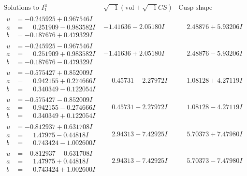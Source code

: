 \documentclass[1p]{elsarticle_modified}
\theoremstyle{definition}
\newcommand{\I}{\sqrt{-1}}
\begin{document}
$$\begin{array}{c|c|c}  
\text{Solutions to }I^u_{1}& \I (\text{vol} + \sqrt{-1}CS) & \text{Cusp shape}\\
 \hline 
\begin{aligned}
u &= -0.245925 + 0.967546 I \\
a &= \phantom{-}0.251909 - 0.983582 I \\
b &= -0.187676 + 0.479329 I\end{aligned}
 & -1.41636 - 2.05180 I & \phantom{-}2.48876 + 5.93206 I \\ \hline\begin{aligned}
u &= -0.245925 - 0.967546 I \\
a &= \phantom{-}0.251909 + 0.983582 I \\
b &= -0.187676 - 0.479329 I\end{aligned}
 & -1.41636 + 2.05180 I & \phantom{-}2.48876 - 5.93206 I \\ \hline\begin{aligned}
u &= -0.575427 + 0.852009 I \\
a &= \phantom{-}0.942155 + 0.274666 I \\
b &= \phantom{-}0.340349 - 0.122054 I\end{aligned}
 & \phantom{-}0.45731 - 2.27972 I & \phantom{-}1.08128 + 4.27119 I \\ \hline\begin{aligned}
u &= -0.575427 - 0.852009 I \\
a &= \phantom{-}0.942155 - 0.274666 I \\
b &= \phantom{-}0.340349 + 0.122054 I\end{aligned}
 & \phantom{-}0.45731 + 2.27972 I & \phantom{-}1.08128 - 4.27119 I \\ \hline\begin{aligned}
u &= -0.812937 + 0.631708 I \\
a &= \phantom{-}1.47975 - 0.44818 I \\
b &= \phantom{-}0.743424 - 1.002600 I\end{aligned}
 & \phantom{-}2.94313 - 7.42925 I & \phantom{-}5.70373 + 7.47980 I \\ \hline\begin{aligned}
u &= -0.812937 - 0.631708 I \\
a &= \phantom{-}1.47975 + 0.44818 I \\
b &= \phantom{-}0.743424 + 1.002600 I\end{aligned}
 & \phantom{-}2.94313 + 7.42925 I & \phantom{-}5.70373 - 7.47980 I \\ \hline\begin{aligned}

\end{aligned}
\end{array}$$
\end{document}
